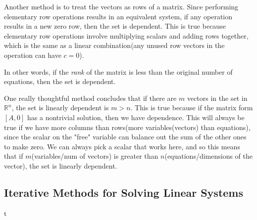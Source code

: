 \documentclass{article}
\begin{document}
Another method is to treat the vectors as rows of a matrix. Since performing elementary row operations results in an equivalent system, if any operation results in a new zero row, then the set is dependent. This is true because elementary row operations involve multiplying scalars and adding rows together, which is the same as a linear combination(any unused row vectors in the operation can have $c = 0$).

In other words, if the \textit{rank} of the matrix is less than the original number of equations, then the set is dependent.

One really thoughtful method concludes that if there are $m$ vectors in the set in $\mathbb{R}^n$, the set is linearly dependent is $m > n$. This is true because if the matrix form $[A,0]$ has a nontrivial solution, then we have dependence. This will always be true if we have more columns than rows(more variables(vectors) than equations), since the scalar on the "free" variable can balance out the sum of the other ones to make zero. We can always pick a scalar that works here, and so this means that if $m$(variables/num of vectors) is greater than $n$(equations/dimensions of the vector), the set is linearly dependent.
\setcounter{subsection}{4}
\subsection{Iterative Methods for Solving Linear Systems}t
\end{document}
